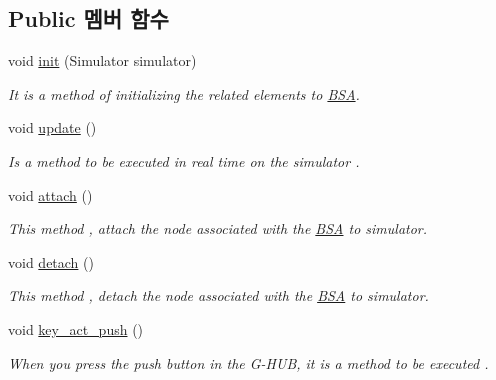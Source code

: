 \subsection*{Public 멤버 함수}
\begin{DoxyCompactItemize}
\item 
void \hyperlink{classkr_1_1ac_1_1kookmin_1_1cs_1_1_b_s_a_1_1_b_s_a_hud_a98a07afc224f8f9374e934cb69f1de00}{init} (Simulator simulator)
\begin{DoxyCompactList}\small\item\em It is a method of initializing the related elements to \hyperlink{namespacekr_1_1ac_1_1kookmin_1_1cs_1_1_b_s_a}{B\+S\+A}. \end{DoxyCompactList}\item 
void \hyperlink{classkr_1_1ac_1_1kookmin_1_1cs_1_1_b_s_a_1_1_b_s_a_hud_a74c1637acb3398ef86da500f100c630d}{update} ()
\begin{DoxyCompactList}\small\item\em Is a method to be executed in real time on the simulator . \end{DoxyCompactList}\item 
void \hyperlink{classkr_1_1ac_1_1kookmin_1_1cs_1_1_b_s_a_1_1_b_s_a_hud_aa92574e989e21ef14b0c53f0220dc488}{attach} ()
\begin{DoxyCompactList}\small\item\em This method , attach the node associated with the \hyperlink{namespacekr_1_1ac_1_1kookmin_1_1cs_1_1_b_s_a}{B\+S\+A} to simulator. \end{DoxyCompactList}\item 
void \hyperlink{classkr_1_1ac_1_1kookmin_1_1cs_1_1_b_s_a_1_1_b_s_a_hud_a7f2ad3023b835013511046876de1b38b}{detach} ()
\begin{DoxyCompactList}\small\item\em This method , detach the node associated with the \hyperlink{namespacekr_1_1ac_1_1kookmin_1_1cs_1_1_b_s_a}{B\+S\+A} to simulator. \end{DoxyCompactList}\item 
void \hyperlink{classkr_1_1ac_1_1kookmin_1_1cs_1_1_b_s_a_1_1_b_s_a_hud_a3e66906fe591f6d39d6305ff17444464}{key\+\_\+act\+\_\+push} ()
\begin{DoxyCompactList}\small\item\em When you press the push button in the G-\/\+H\+U\+B, it is a method to be executed . \end{DoxyCompactList}\end{DoxyCompactItemize}
